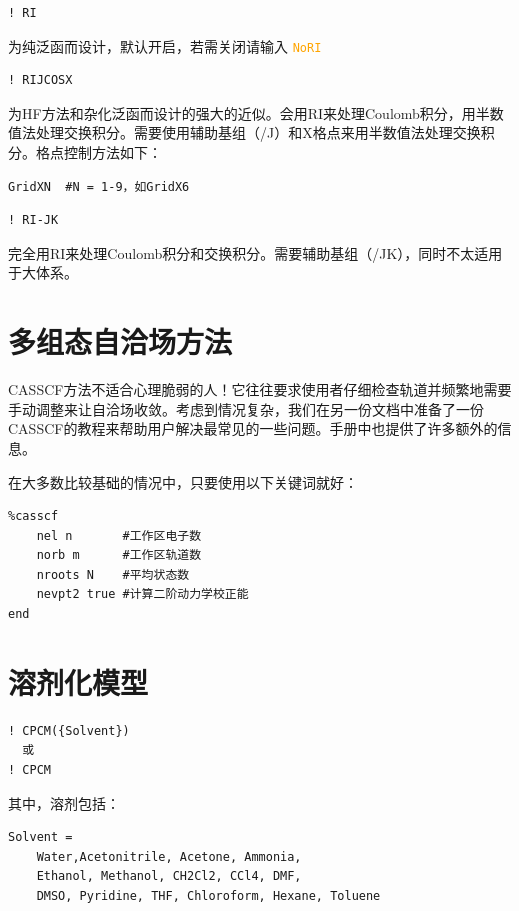 \documentclass{ctexart}
\newcommand{\cmd}[1]{ \textcolor{orange}{\texttt{#1}} }
\begin{document}
	\begin{lstlisting}
! RI
	\end{lstlisting}
	
	为纯泛函而设计，默认开启，若需关闭请输入\cmd{NoRI}
	
	\begin{lstlisting}
! RIJCOSX
	\end{lstlisting}
	
	为HF方法和杂化泛函而设计的强大的近似。会用RI来处理Coulomb积分，用半数值法处理交换积分。需要使用辅助基组（/J）和X格点来用半数值法处理交换积分。格点控制方法如下：
	\begin{lstlisting}
GridXN  #N = 1-9，如GridX6
	\end{lstlisting}
	
	\begin{lstlisting}
! RI-JK
	\end{lstlisting}
	
	完全用RI来处理Coulomb积分和交换积分。需要辅助基组（/JK），同时不太适用于大体系。
	
	\section{多组态自洽场方法} 
	
	CASSCF方法不适合心理脆弱的人！它往往要求使用者仔细检查轨道并频繁地需要手动调整来让自洽场收敛。考虑到情况复杂，我们在另一份文档中准备了一份CASSCF的教程来帮助用户解决最常见的一些问题。手册中也提供了许多额外的信息。
	
	在大多数比较基础的情况中，只要使用以下关键词就好：
	
	\begin{lstlisting}
%casscf 
	nel n		#工作区电子数
	norb m		#工作区轨道数
	nroots N	#平均状态数
	nevpt2 true	#计算二阶动力学校正能
end
	\end{lstlisting}
	
	\section{溶剂化模型} 
	\begin{lstlisting}
! CPCM({Solvent})
  或
! CPCM
	\end{lstlisting}
	
	其中，溶剂包括：
	\begin{lstlisting}
Solvent = 
	Water,Acetonitrile, Acetone, Ammonia, 
	Ethanol, Methanol, CH2Cl2, CCl4, DMF, 
	DMSO, Pyridine, THF, Chloroform, Hexane, Toluene
	\end{lstlisting}
	
\end{document}
